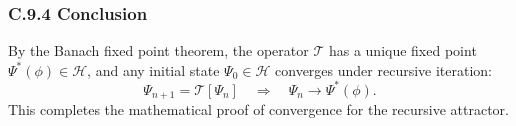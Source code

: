 \subsubsection*{C.9.4 Conclusion}

By the Banach fixed point theorem, the operator \( \mathcal{T} \) has a unique fixed point \( \Psi^*(\phi) \in \mathcal{H} \), and any initial state \( \Psi_0 \in \mathcal{H} \) converges under recursive iteration:
\[
\Psi_{n+1} = \mathcal{T}[\Psi_n] \quad \Rightarrow \quad \Psi_n \to \Psi^*(\phi).
\]
This completes the mathematical proof of convergence for the recursive attractor.
